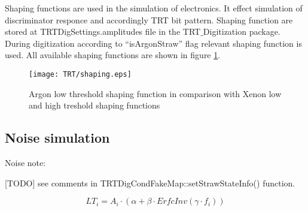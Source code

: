 Shaping functions are used in the simulation of electronics. It effect simulation of discriminator responce and accordingly TRT bit pattern.
Shaping function are stored at \mbox{TRTDigSettings.amplitudes} file in the \mbox{TRT$\_$Digitization} package. During digitization according to ``isArgonStraw'' flag relevant shaping function is used. 
All available shaping functions are shown in figure \ref{fig:shaping}.

\begin{figure}
\begin{center}
 \texttt{[image: TRT/shaping.eps]}
\caption{\label{fig:shaping} Argon low threshold shaping function in comparison with Xenon low and high treshold shaping functions}
\end{center}
\end{figure}





\subsection{Noise simulation}

Noise note:~\cite{Kittelmann:987854}

[TODO] see comments in TRTDigCondFakeMap::setStrawStateInfo() function.


\begin{equation}
 LT_i = A_i \cdot (\alpha + \beta \cdot ErfcInv(\gamma \cdot f_i)) %
\end{equation}





